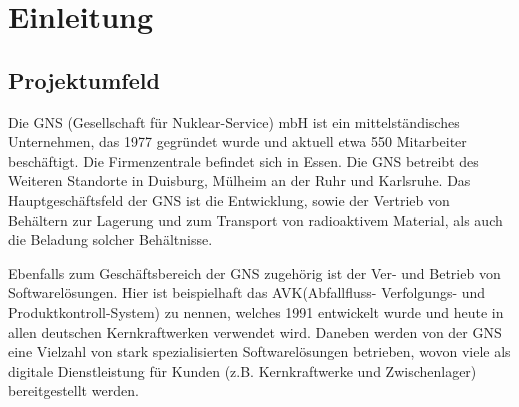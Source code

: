 \documentclass[12pt, xcolor=dvipsnames]{scrartcl}
\begin{document}

\clearpage

\makeatletter
  \renewcommand\l@subsection{\@dottedtocline{2}{1.5em}{2.8em}}
\makeatother
{}
\tableofcontents


\listoffigures

\listoftables

\lstlistoflistings

\printnomenclature		
\clearpage



\section{Einleitung}

\subsection{Projektumfeld}
\label{sec:projektumfeld}

Die GNS (Gesellschaft für Nuklear-Service) mbH ist ein mittelständisches Unternehmen, das 1977 gegründet wurde und aktuell etwa 550 Mitarbeiter beschäftigt. Die Firmenzentrale befindet sich in Essen. Die GNS betreibt des Weiteren Standorte in Duisburg, Mülheim an der Ruhr und Karlsruhe. Das Hauptgeschäftsfeld der GNS ist die Entwicklung, sowie der Vertrieb von Behältern zur Lagerung und zum Transport von radioaktivem Material, als auch die Beladung solcher Behältnisse.


Ebenfalls zum Geschäftsbereich der GNS zugehörig ist der Ver- und Betrieb von Softwarelösungen. Hier ist beispielhaft das AVK(Abfallfluss- Verfolgungs- und Produktkontroll-System) zu nennen, welches 1991 entwickelt wurde und heute in allen deutschen Kernkraftwerken verwendet wird.  Daneben werden von der GNS eine Vielzahl von stark spezialisierten Softwarelösungen betrieben, wovon viele als digitale Dienstleistung für Kunden (z.B. Kernkraftwerke und Zwischenlager) bereitgestellt werden. \\
\end{document}
